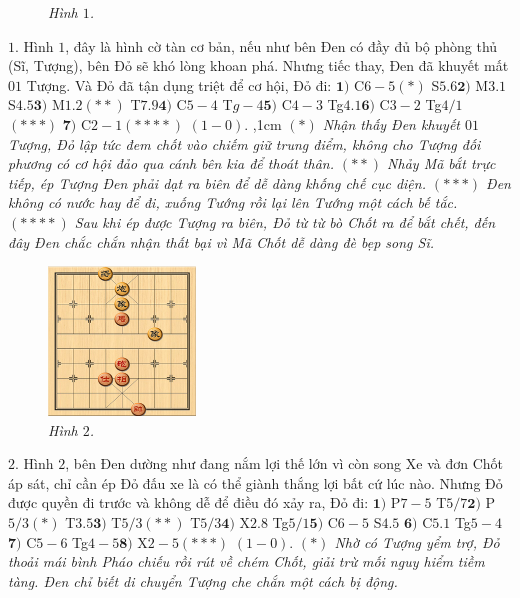 \begin{multicols}{2}
\begin{figure}[H]
		\caption{\small\textit{\color{gocco}Hình $1$.}}
		\vspace*{-10pt}
	\end{figure}
	$1.$ Hình  $1$, đây là hình cờ tàn cơ bản, nếu như bên Đen có đầy đủ bộ phòng thủ (Sĩ, Tượng), bên Đỏ sẽ khó lòng khoan phá. Nhưng tiếc thay, Đen đã khuyết mất $01$ Tượng. Và Đỏ đã tận dụng triệt để cơ hội, Đỏ đi:
	\vskip 0.05cm
	$\pmb{1)}$ C$6-5$$(*)$ S$5.6$\quad $\pmb{2)}$ M$3.1$ S$4.5$\quad $\pmb{3)}$ M$1.2$$(**)$ T$7.9$\quad $\pmb{4)}$ C$5-4$ T$g-4$\quad $\pmb{5)}$ C$4-3$ Tg$4.1$\quad $\pmb{6)}$ C$3-2$ Tg$4/1$$(***)$ \quad$\pmb{7)}$ C$2-1$$(****)$ $(1-0)$.
	,1cm
	\textit{$(*)$ Nhận thấy Đen khuyết $01$ Tượng, Đỏ lập tức đem chốt vào chiếm giữ trung điểm, không cho Tượng đối phương có cơ hội đảo qua cánh bên kia để thoát thân. 
	\vskip 0.05cm
	$(**)$ Nhảy Mã bắt trực tiếp, ép Tượng Đen phải dạt ra biên để dễ dàng khống chế cục diện.
	\vskip 0.05cm
	$(***)$ Đen không có nước hay để đi, xuống Tướng rồi lại lên Tướng một cách bế tắc.
	\vskip 0.05cm
	$(****)$ Sau khi ép được Tượng ra biên, Đỏ  từ từ bò Chốt ra để bắt chết, đến đây Đen chắc chắn nhận thất bại vì Mã Chốt dễ dàng đè bẹp song Sĩ.}
	\begin{figure}[H]
		\vspace*{-10pt}
		\centering
		\captionsetup{labelformat= empty, justification=centering}
		\includegraphics[width= 0.35\textwidth]{2}
		\caption{\small\textit{\color{gocco}Hình $2$.}}
		\vspace*{-10pt}
	\end{figure}
	$2.$ Hình $2$, bên Đen dường như đang nắm lợi thế lớn vì còn song Xe và đơn Chốt áp sát, chỉ cần ép Đỏ đấu xe là có thể giành thắng lợi bất cứ lúc nào. Nhưng Đỏ được quyền đi trước và không dễ để điều đó xảy ra, Đỏ đi:
	\vskip 0.05cm
	$\pmb{1)}$ P$7-5$ T$5/7$\quad  $\pmb{2)}$ P$5/3$$(*)$ T$3.5$\quad  $\pmb{3)}$ T$5/3$$(**)$ T$5/3$\quad $\pmb{4)}$ X$2.8$ Tg$5/1$\quad $\pmb{5)}$ C$6-5$  S$4.5$ \quad$\pmb{6)}$ C$5.1$ Tg$5-4$\quad $\pmb{7)}$ C$5-6$ Tg$4-5$\quad $\pmb{8)}$ X$2-5$$(***)$ $(1-0)$.
	\vskip 0.05cm
	\textit{$(*)$ Nhờ có Tượng yểm trợ, Đỏ thoải mái bình Pháo chiếu rồi rút về chém Chốt, giải trừ mối nguy hiểm tiềm tàng. Đen chỉ biết di chuyển Tượng che chắn một cách bị động.
}$$
\end{multicols}
